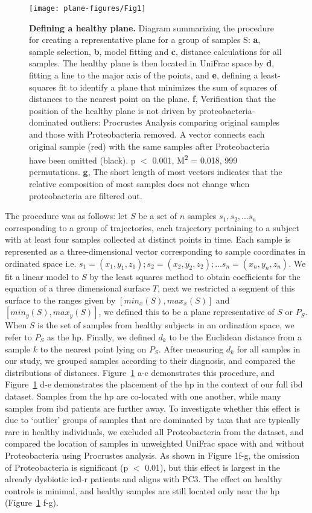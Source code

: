 \begin{figure}[htbp]
\texttt{[image: plane-figures/Fig1]}
\caption[Defining a healthy plane.]{\textbf{Defining a healthy plane.} Diagram summarizing the procedure for creating a representative plane for a group of samples S: \textbf{a}, sample selection, \textbf{b}, model fitting and \textbf{c}, distance calculations for all samples. The healthy plane is then located in UniFrac space by \textbf{d}, fitting a line to the major axis of the points, and \textbf{e}, defining a least-squares fit to identify a plane that minimizes the sum of squares of distances to the nearest point on the plane. \textbf{f}, Verification that the position of the healthy plane is not driven by proteobacteria-dominated outliers: Procrustes Analysis comparing original samples and those with Proteobacteria removed. A vector connects each original sample (red) with the same samples after Proteobacteria have been omitted (black). p $<$ 0.001, M\textsuperscript{2} = 0.018, 999 permutations. \textbf{g}, The short length of most vectors indicates that the relative composition of most samples does not change when proteobacteria are filtered out.}
\label{plane-fig1}
\end{figure} 

The procedure was as follows: let $S$ be a set of $n$ samples $s_1,s_2, \dots 
s_n$ corresponding to a group of trajectories, each trajectory pertaining to a 
subject with at least four samples collected at distinct points in time. Each 
sample is represented as a three-dimensional vector corresponding to sample 
coordinates in ordinated space i.e. $s_1=(x_1,y_1,z_1); s_2=(x_2,y_2,z_2); 
\dots s_n=(x_n,y_n,z_n)$. We fit a linear model to $S$ by the least squares 
method to obtain coefficients for the equation of a three dimensional surface 
$T$, next we restricted a segment of this surface to the ranges given by 
$[min_x (S),max_x (S)]$ and $[min_y (S),max_y (S)]$, we defined this to be a 
plane representative of $S$ or $P_S$. When $S$ is the set of samples from 
healthy subjects in an ordination space, we refer to $P_S$ as the \gls{hp}.  
Finally, we defined $d_k$ to be the Euclidean distance from a sample $k$ to the 
nearest point lying on $P_S$. After measuring $d_k$ for all samples in our 
study, we grouped samples according to their diagnosis, and compared the 
distributions of distances. Figure~\ref{plane-fig1} a-c demonstrates this 
procedure, and Figure~\ref{plane-fig1} d-e demonstrates the placement of the 
\gls{hp} in the context of our full \gls{ibd} dataset. Samples from the 
\gls{hp} are co-located with one another, while many samples from \gls{ibd} 
patients are further away.  To investigate whether this effect is due to 
`outlier' groups of samples that are dominated by taxa that are typically rare 
in healthy individuals, we excluded all Proteobacteria from the dataset, and 
compared the location of samples in unweighted UniFrac space with and without 
Proteobacteria using Procrustes analysis. As shown in Figure 1f-g, the omission 
of Proteobacteria is significant (p $<$ 0.01), but this effect is largest in 
the already dysbiotic \gls{icd}-r patients and aligns with PC3. The effect on 
healthy controls is minimal, and healthy samples are still located only near 
the \gls{hp} (Figure~\ref{plane-fig1} f-g).

